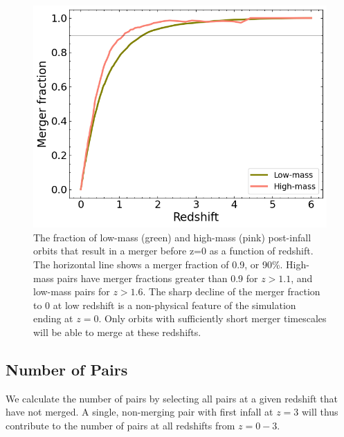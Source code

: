 \documentclass[twocolumn,linenumbers]{aastex631}
\begin{document}
\begin{figure}[htb]
    \begin{center}
    \includegraphics[width=\columnwidth]{plots/bet-on-it/6_mergerfraction.png}
    \caption{The fraction of low-mass (green) and high-mass (pink) post-infall orbits that result in a merger before z=0 as a function of redshift. 
    The horizontal line shows a merger fraction of 0.9, or 90\%. 
    High-mass pairs have merger fractions greater than 0.9 for $z>1.1$, and low-mass pairs for $z>1.6$.
    The sharp decline of the merger fraction to 0 at low redshift is a non-physical feature of the simulation ending at $z=0$.
    Only orbits with sufficiently short merger timescales will be able to merge at these redshifts.}
    \label{fig:fmerge}
    \end{center}
\end{figure}

\subsection{Number of Pairs}\label{sec:pairprops-num}
We calculate the number of pairs by selecting all pairs at a given redshift that have not merged.
A single, non-merging pair with first infall at $z=3$ will thus contribute to the number of pairs at all redshifts from $z=0-3$. 
\end{document}
